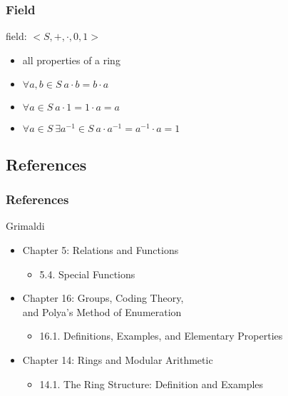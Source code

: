 \documentclass[dvipsnames]{beamer}
\begin{document}
\begin{frame}
  \frametitle{Field}

  \begin{definition}
    \alert{field}: $<S,+,\cdot,0,1>$
    \begin{itemize}
      \item all properties of a ring

      \pause
      \item $\forall a,b \in S~a \cdot b = b \cdot a$
      \item $\forall a \in S~a \cdot 1 = 1 \cdot a = a$
      \item $\forall a \in S~\exists a^{-1} \in S~a \cdot a^{-1} = a^{-1} \cdot a = 1$
    \end{itemize}
  \end{definition}
\end{frame}

\subsection*{References}

\begin{frame}
  \frametitle{References}

  \begin{block}{Grimaldi}
    \begin{itemize}
      \item Chapter 5: Relations and Functions
      \begin{itemize}
        \item 5.4. \alert{Special Functions}
      \end{itemize}

      \item Chapter 16: Groups, Coding Theory,\\
        and Polya's Method of Enumeration
      \begin{itemize}
        \item 16.1. \alert{Definitions, Examples, and Elementary Properties}
      \end{itemize}

      \item Chapter 14: Rings and Modular Arithmetic
      \begin{itemize}
        \item 14.1. \alert{The Ring Structure: Definition and Examples}
      \end{itemize}
    \end{itemize}
  \end{block}
\end{frame}
\end{document}
